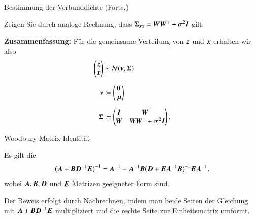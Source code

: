 \begin{frame}{Bestimmung der Verbunddichte (Forts.)}{}
	\begin{mytask}
		Zeigen Sie durch analoge Rechnung, dass $\bm{\Sigma}_{\bm{x}\bm{x}} = \bm{W} \bm{W}^\top + \sigma^2 \bm{I}$ gilt.
	\end{mytask}
	
	\begin{boxGray}
		\textbf{Zusammenfassung:} Für die gemeinsame Verteilung von $\bm{z}$ und $\bm{x}$ erhalten wir also
		\begin{equation} \label{eq:ppca-expectation-joint-dist-detail}
			\begin{aligned}
				\begin{pmatrix} \bz \\ \bx \end{pmatrix}
					&\sim \norm(\bnu, \bSigma)
			\\[2mm]
				\bnu
					&\coloneqq \begin{pmatrix} \0 \\ \bmu \end{pmatrix}
			\\[2mm]
				\bSigma
					&\coloneqq \begin{pmatrix} \bI & \bW^\top \\ \bW & \bW \bW^\top + \sigma^2 \bI \end{pmatrix}.
			\end{aligned}
		\end{equation}
	\end{boxGray}
\end{frame}


\begin{frame}{Woodbury Matrix-Identität}{}
	\begin{mytheo}
		Es gilt die 
		\begin{equation*}
			\bigl( \bm{A} + \bm{B} \bm{D}^{-1} \bm{E} \bigr)^{-1}
				= \bm{A}^{-1} - \bm{A}^{-1} \bm{B} \bigl( \bm{D} + \bm{E} \bm{A}^{-1} \bm{B} \bigr)^{-1} \bm{E} \bm{A}^{-1},
		\end{equation*}
		wobei $\bm{A}, \bm{B}, \bm{D}$ und $\bm{E}$ Matrizen geeigneter Form sind.
	\end{mytheo}
	
	\begin{myproof}
		Der Beweis erfolgt durch Nachrechnen, indem man beide Seiten der Gleichung mit $\bm{A} + \bm{B} \bm{D}^{-1} \bm{E}$
		multipliziert und die rechte Seite zur Einheitsmatrix umformt.
	\end{myproof}
\end{frame}


